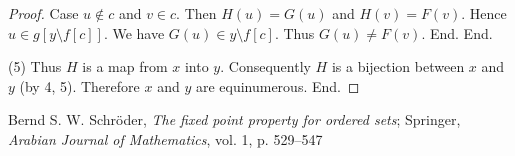 \documentclass{article}
\begin{document}
\begin{forthel}
\begin{proof}
          Case $u \notin c$ and $v \in c$.
            Then $H(u) = G(u)$ and $H(v) = F(v)$.
            Hence $u \in g[y \setminus f[c]]$.
            We have $G(u) \in y \setminus f[c]$.
            Thus $G(u) \neq F(v)$.
          End.
        End.

        (5) Thus $H$ is a map from $x$ into $y$.
        Consequently $H$ is a bijection between $x$ and $y$ (by 4, 5).
        Therefore $x$ and $y$ are equinumerous.
      End.
    \end{proof}
  \end{forthel}

  \begin{thebibliography}{1}
     Bernd S. W. Schröder,
      \textit{The fixed point property for ordered sets};
      Springer, \textit{Arabian Journal of Mathematics}, vol. 1, p. 529--547
  \end{thebibliography}
\end{document}
